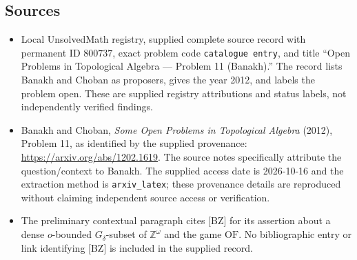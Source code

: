 \documentclass[11pt]{article}
\begin{document}
\subsection{Sources}
\begin{itemize}
\item Local UnsolvedMath registry, supplied complete source record with permanent ID \(800737\), exact problem code \texttt{catalogue entry}, and title ``Open Problems in Topological Algebra --- Problem 11 (Banakh).'' The record lists Banakh and Choban as proposers, gives the year 2012, and labels the problem open. These are supplied registry attributions and status labels, not independently verified findings.
\item Banakh and Choban, \emph{Some Open Problems in Topological Algebra} (2012), Problem 11, as identified by the supplied provenance: \url{https://arxiv.org/abs/1202.1619}. The source notes specifically attribute the question/context to Banakh. The supplied access date is 2026-10-16 and the extraction method is \texttt{arxiv\_latex}; these provenance details are reproduced without claiming independent source access or verification.
\item The preliminary contextual paragraph cites [BZ] for its assertion about a dense \(o\)-bounded \(G_\delta\)-subset of \(\mathbb{Z}^{\omega}\) and the game \(\mathrm{OF}\). No bibliographic entry or link identifying [BZ] is included in the supplied record.
\end{itemize}
\end{document}
